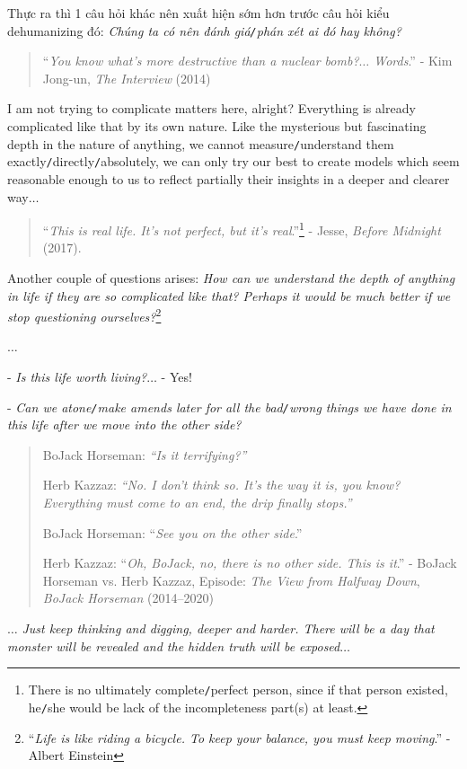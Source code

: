 \documentclass[12pt]{article}
\begin{document}
Thực ra thì 1 câu hỏi khác nên xuất hiện sớm hơn trước câu hỏi kiểu dehumanizing đó: {\it Chúng ta có nên đánh giá{\tt/}phán xét ai đó hay không?}
\begin{quotation}
	``{\it You know what's more destructive than a nuclear bomb?$\ldots$ Words}.'' - Kim Jong-un, {\it The Interview} (2014)
\end{quotation}
I am not trying to complicate matters here, alright? Everything is already complicated like that by its own nature. Like the mysterious but fascinating depth in the nature of anything, we cannot measure{\tt/}understand them exactly{\tt/}directly{\tt/}absolutely, we can only try our best to create models which seem reasonable enough to us to reflect partially their insights in a deeper and clearer way$\ldots$

\begin{quotation}
	``{\it This is real life. It's not perfect, but it's real}.''\footnote{There is no ultimately complete{\tt/}perfect person, since if that person existed, he{\tt/}she would be lack of the incompleteness part(s) at least.} - Jesse, {\it Before Midnight} (2017).
\end{quotation}
Another couple of questions arises: {\it How can we understand the depth of anything in life if they are so complicated like that? Perhaps it would be much better if we stop questioning ourselves?}\footnote{``{\it Life is like riding a bicycle. To keep your balance, you must keep moving}.'' - Albert Einstein}

$\ldots$

- {\it Is this life worth living?}$\ldots$ - Yes!

- {\it Can we atone{\tt/}make amends later for all the bad{\tt/}wrong things we have done in this life after we move into the other side?}
\begin{quotation}    
	BoJack Horseman: {\it ``Is it terrifying?''}
	
	Herb Kazzaz: {\it ``No. I don't think so. It's the way it is, you know? Everything must come to an end, the drip finally stops.''}
	
	BoJack Horseman: ``{\it See you on the other side}.''
	
	Herb Kazzaz: ``{\it Oh, BoJack, no, there is no other side. This is it}.'' - BoJack Horseman vs. Herb Kazzaz,  Episode: {\it The View from Halfway Down}, {\it BoJack Horseman} (2014--2020)
\end{quotation}
$\ldots$ {\it Just keep thinking and digging, deeper and harder. There will be a day that monster will be revealed and the hidden truth will be exposed}$\ldots$
\end{document}
